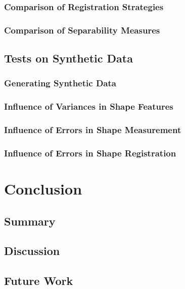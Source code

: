 \documentclass[pdftex,12pt,a4paper]{report}
\begin{document}
\subsection{Comparison of Registration Strategies}

\subsection{Comparison of Separability Measures}

\section{Tests on Synthetic Data}

\subsection{Generating Synthetic Data}

\subsection{Influence of Variances in Shape Features}

\subsection{Influence of Errors in Shape Measurement}

\subsection{Influence of Errors in Shape Registration}

\chapter{Conclusion}

\section{Summary}

\section{Discussion}

\section{Future Work}
\end{document}
